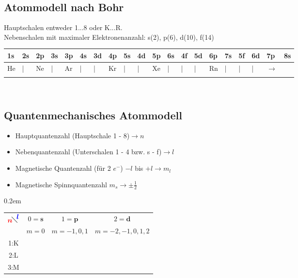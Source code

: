 \documentclass[eglish/german]{latex4ei/latex4ei_sheet}
\begin{document}
\begin{sectionbox}
	\subsection{Atommodell nach Bohr}
		Hauptschalen entweder 1...8 oder K...R.\\
		Nebenschalen mit maximaler Elektronenanzahl: s(2), p(6), d(10), f(14)\\
		\setlength{\tabcolsep}{0.25em}
		\begin{tabular}{llllllllllllllllllll}
			\ctrule
			1s & 2s & 2p & 3s & 3p & 4s & 3d & 4p & 5s & 4d & 5p & 6s & 4f & 5d & 6p & 7s & 5f & 6d & 7p & 8s\\
			\midrule
			He &  | & Ne &	| & Ar &  | & |  & Kr &  | & |  & Xe &	| &  | & |  & Rn &  |  &  |  &  |  &  $\rightarrow$  &\\
			\ctrule
		\end{tabular}\\
	\end{sectionbox}

\begin{sectionbox}
	\subsection{Quantenmechanisches Atommodell}
		\begin{itemize}
			\item Hauptquantenzahl (Hauptschale 1 - 8)$\rightarrow n$
			\item Nebenquantenzahl (Unterschalen 1 - 4 bzw. s - f)$\rightarrow l$
			\item Magnetische Quantenzahl (für 2 $e^-$) $-l$ bis $+l$$\rightarrow m_l$
			\item Magnetische Spinnquantenzahl $m_s \rightarrow \pm \frac{1}{2}$ 
		\end{itemize}
		\vspace{0,5cm}

		{ \fboxsep0.2em
		\begin{tabular}{c|ccc}
			${}_{\color{red}\displaystyle \boldsymbol{n}}\!{\LARGE \diagdown}\!{}^{\color{blue}\displaystyle \boldsymbol{l}}$ & \color{blue}$0 =\textbf{s}$ & \color{blue}$1 = \textbf{p}$ & \color{blue}$2 = \textbf{d}$\\ \mrule
			& $m = 0$ & $m=-1,0,1$ & $m=-2,-1,0,1,2$\\
			\color{red}1:K & \fbox{$\uparrow\downarrow$} & \\[0.2em]
			\color{red}2:L & \fbox{$\uparrow\downarrow$} & \fbox{$\uparrow\downarrow$}\fbox{$\uparrow\downarrow$}\fbox{$\uparrow\downarrow$}\\[0.2em]
			\color{red}3:M & \fbox{$\uparrow\downarrow$} & \fbox{$\uparrow\downarrow$}\fbox{$\uparrow\downarrow$}\fbox{$\uparrow\downarrow$} & \fbox{$\uparrow\downarrow$}\fbox{$\uparrow\downarrow$}\fbox{$\uparrow\downarrow$}\fbox{$\uparrow\downarrow$}\fbox{$\uparrow\downarrow$}\\
			\end{tabular} 
			}
\end{sectionbox}
\end{document}
